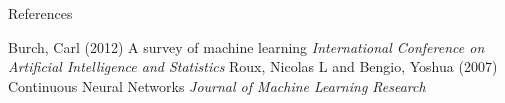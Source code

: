\begin{block}{References}
\footnotesize{
    \begin{thebibliography}{99} %
         Burch, Carl (2012)
        \newblock A survey of machine learning
        \newblock \emph{International Conference on Artificial Intelligence and Statistics}
         Roux, Nicolas L and Bengio, Yoshua (2007)
        \newblock Continuous Neural Networks
        \newblock \emph{Journal of Machine Learning Research}
        
    \end{thebibliography}
}


 \end{block}
